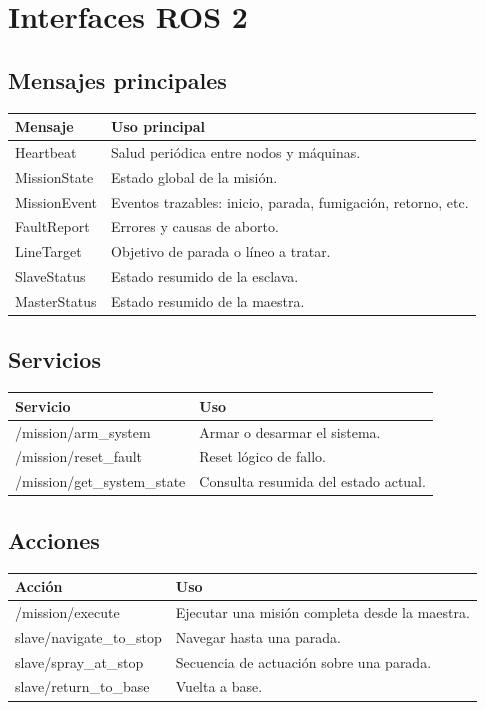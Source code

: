 \documentclass[11pt,a4paper]{article}
\begin{document}
\section{Interfaces ROS 2}
\subsection{Mensajes principales}
\begin{center}
\begin{tabularx}{\textwidth}{>{\ttfamily}l X}
\toprule
Mensaje & Uso principal \\
\midrule
Heartbeat & Salud peri\'odica entre nodos y m\'aquinas. \\
MissionState & Estado global de la misi\'on. \\
MissionEvent & Eventos trazables: inicio, parada, fumigaci\'on, retorno, etc. \\
FaultReport & Errores y causas de aborto. \\
LineTarget & Objetivo de parada o l\'ineo a tratar. \\
SlaveStatus & Estado resumido de la esclava. \\
MasterStatus & Estado resumido de la maestra. \\
\bottomrule
\end{tabularx}
\end{center}

\subsection{Servicios}
\begin{center}
\begin{tabularx}{\textwidth}{>{\ttfamily}l X}
\toprule
Servicio & Uso \\
\midrule
/mission/arm\_system & Armar o desarmar el sistema. \\
/mission/reset\_fault & Reset l\'ogico de fallo. \\
/mission/get\_system\_state & Consulta resumida del estado actual. \\
\bottomrule
\end{tabularx}
\end{center}

\subsection{Acciones}
\begin{center}
\begin{tabularx}{\textwidth}{>{\ttfamily}l X}
\toprule
Acci\'on & Uso \\
\midrule
/mission/execute & Ejecutar una misi\'on completa desde la maestra. \\
slave/navigate\_to\_stop & Navegar hasta una parada. \\
slave/spray\_at\_stop & Secuencia de actuaci\'on sobre una parada. \\
slave/return\_to\_base & Vuelta a base. \\
\bottomrule
\end{tabularx}
\end{center}
\end{document}
